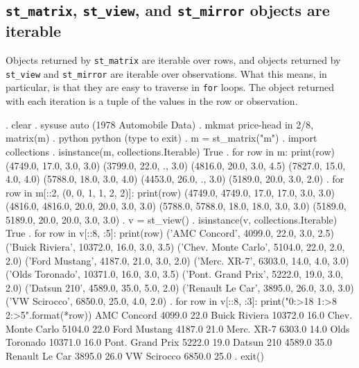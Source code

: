 \documentclass{article}
\begin{document}
\subsection{\lstinline$st_matrix$, \lstinline$st_view$, and \lstinline$st_mirror$ objects are iterable} \label{iterable}

Objects returned by \lstinline{st_matrix} are iterable over rows, and objects returned by \lstinline{st_view} and \lstinline{st_mirror} are iterable over observations. What this means, in particular, is that they are easy to traverse in \lstinline{for} loops. The object returned with each iteration is a tuple of the values in the row or observation.

\begin{stlog}
. clear
{\smallskip}
. sysuse auto
(1978 Automobile Data)
{\smallskip}
. mkmat price-head in 2/8, matrix(m)
{\smallskip}
. python
 python (type {} to exit) 
{\bftt{>>>}}. m = st_matrix("m")
{\smallskip}
{\bftt{>>>}}. import collections
{\smallskip}
{\bftt{>>>}}. isinstance(m, collections.Iterable)
True
{\smallskip}
{\bftt{>>>}}. for row in m: print(row)
(4749.0, 17.0, 3.0, 3.0)
(3799.0, 22.0, ., 3.0)
(4816.0, 20.0, 3.0, 4.5)
(7827.0, 15.0, 4.0, 4.0)
(5788.0, 18.0, 3.0, 4.0)
(4453.0, 26.0, ., 3.0)
(5189.0, 20.0, 3.0, 2.0)
{\smallskip}
{\bftt{>>>}}. for row in m[::2, (0, 0, 1, 1, 2, 2)]: print(row)
(4749.0, 4749.0, 17.0, 17.0, 3.0, 3.0)
(4816.0, 4816.0, 20.0, 20.0, 3.0, 3.0)
(5788.0, 5788.0, 18.0, 18.0, 3.0, 3.0)
(5189.0, 5189.0, 20.0, 20.0, 3.0, 3.0)
{\smallskip}
{\bftt{>>>}}. v = st_view()
{\smallskip}
{\bftt{>>>}}. isinstance(v, collections.Iterable)
True
{\smallskip}
{\bftt{>>>}}. for row in v[::8, :5]: print(row)
('AMC Concord', 4099.0, 22.0, 3.0, 2.5)
('Buick Riviera', 10372.0, 16.0, 3.0, 3.5)
('Chev. Monte Carlo', 5104.0, 22.0, 2.0, 2.0)
('Ford Mustang', 4187.0, 21.0, 3.0, 2.0)
('Merc. XR-7', 6303.0, 14.0, 4.0, 3.0)
('Olds Toronado', 10371.0, 16.0, 3.0, 3.5)
('Pont. Grand Prix', 5222.0, 19.0, 3.0, 2.0)
('Datsun 210', 4589.0, 35.0, 5.0, 2.0)
('Renault Le Car', 3895.0, 26.0, 3.0, 3.0)
('VW Scirocco', 6850.0, 25.0, 4.0, 2.0)
{\smallskip}
{\bftt{>>>}}. for row in v[::8, :3]: print("{\lbr}0:>18{\rbr} {\lbr}1:>8{\rbr} {\lbr}2:>5{\rbr}".format(*row))
       AMC Concord   4099.0  22.0
     Buick Riviera  10372.0  16.0
 Chev. Monte Carlo   5104.0  22.0
      Ford Mustang   4187.0  21.0
        Merc. XR-7   6303.0  14.0
     Olds Toronado  10371.0  16.0
  Pont. Grand Prix   5222.0  19.0
        Datsun 210   4589.0  35.0
    Renault Le Car   3895.0  26.0
       VW Scirocco   6850.0  25.0
{\smallskip}
{\bftt{>>>}}. exit()
\end{stlog}
\end{document}
